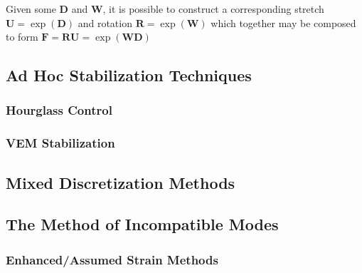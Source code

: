 Given some $\mathbf{D}$ and $\mathbf{W}$, it is possible to construct a corresponding stretch $\mathbf{U} = \exp (\mathbf{D})$ and rotation $\mathbf{R} = \exp (\mathbf{W})$ which together may be composed to form $\mathbf{F} = \mathbf{R} \mathbf{U} = \exp (\mathbf{W} \mathbf{D})$

\subsection{Ad Hoc Stabilization Techniques}
\subsubsection{Hourglass Control}
\subsubsection{VEM Stabilization}

\subsection{Mixed Discretization Methods}

\subsection{The Method of Incompatible Modes}
\subsubsection{Enhanced/Assumed Strain Methods}
